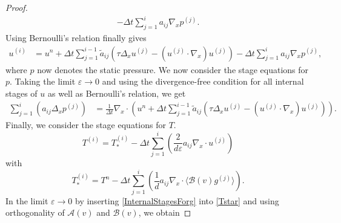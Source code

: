 \documentclass[10pt,a4paper]{amsart}
\newcommand{\A}{\mathcal{A}}
\newcommand{\B}{\mathcal{B}}
\begin{document}
\begin{proof}
\begin{equation}
\begin{split}
- \Delta t  \sum_{j = 1}^i  a_{ij} \nabla_x p^{(j)}.
\end{split}
\end{equation}
Using Bernoulli's relation finally gives 
\begin{equation}
\begin{split} \label{FinalForu}
u^{(i)} &= u^n 
+ \Delta t  \sum_{j=1}^{i-1} \tilde{a}_{ij}  \left( \tau \Delta_x u^{(j)} -  (u^{(j)} \cdot \nabla_x ) u^{(j)}\right) 
- \Delta t  \sum_{j = 1}^i  a_{ij} \nabla_x p^{(j)},
\end{split}
\end{equation}
where $p$ now denotes the static pressure.
We now consider the stage equations for $p$. Taking the limit $\varepsilon \to 0$ and using the divergence-free condition for all internal stages of $u$ as well as Bernoulli's relation, we get
\begin{equation}\begin{split} \label{FinalForp}
  \sum_{j = 1}^{i} \left( a_{ij} \Delta_x p^{(j)} \right)  &=  \frac{1}{\Delta t}\nabla_x \cdot \left( u^n + \Delta t  \sum_{j=1}^{i-1} \tilde{a}_{ij}  
 \left( \tau \Delta_x u^{(j)} -  (u^{(j)} \cdot  \nabla_x ) u^{(j)}\right)  \right).
\end{split}
\end{equation} 
Finally, we consider the stage equations for $T$.
\begin{equation}
		T^{(i)} = T_*^{(i)}- \Delta t  \sum_{j = 1}^i \left(  \frac{2}{d \varepsilon} a_{ij} \nabla_x \cdot u^{(j)}\right) 
\end{equation}
with
\begin{equation}
	\label{Tstar}
	T_*^{(i)} = T^n - \Delta t  \sum_{j = 1}^i \left( \frac{1}{d} a_{ij} \nabla_x \cdot \langle \mathcal{B}(v) g^{(j)} \rangle  \right) .
\end{equation}
 In the limit $\varepsilon \to 0$ by inserting \eqref{InternalStagesForg} into \eqref{Tstar} and using orthogonality of $\A(v)$ and $\B(v)$, we obtain

\end{proof}
\end{document}
